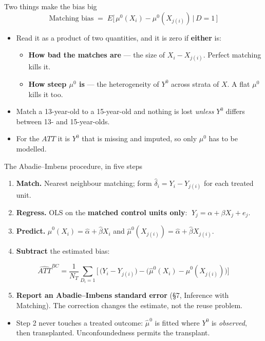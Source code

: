 \documentclass[
  11pt,
  ignorenonframetext,
  aspectratio=169,
]{beamer}
\providecommand{\tightlist}{%
  \setlength{\itemsep}{0pt}\setlength{\parskip}{0pt}}
\begin{document}
\begin{frame}{Two things make the bias big}
\protect{}\label{two-things-make-the-bias-big}
\[
\text{Matching bias} \;=\; E\big[\,\mu^0(X_i) - \mu^0(X_{j(i)}) \,\big|\, D=1\,\big]
\]

\begin{itemize}
\tightlist
\item
  Read it as a product of two quantities, and it is zero if
  \textbf{either} is:

  \begin{itemize}
  \tightlist
  \item
    \textbf{How bad the matches are} --- the size of \(X_i - X_{j(i)}\).
    Perfect matching kills it.
  \item
    \textbf{How steep \(\mu^0\) is} --- the heterogeneity of \(Y^0\)
    across strata of \(X\). A flat \(\mu^0\) kills it too.
  \end{itemize}
\item
  Match a 13-year-old to a 15-year-old and nothing is lost \emph{unless}
  \(Y^0\) differs between 13- and 15-year-olds.
\item
  For the \(ATT\) it is \(Y^0\) that is missing and imputed, so only
  \(\mu^0\) has to be modelled.
\end{itemize}
\end{frame}

\begin{frame}{The Abadie--Imbens procedure, in five steps}
\protect{}\label{the-abadieimbens-procedure-in-five-steps}
\begin{enumerate}
\tightlist
\item
  \textbf{Match.} Nearest neighbour matching; form
  \(\hat\delta_i = Y_i - Y_{j(i)}\) for each treated unit.
\item
  \textbf{Regress.} OLS on the \textbf{matched control units only}:
  \(\;Y_{j} = \alpha + \beta X_{j} + e_j\).
\item
  \textbf{Predict.} \(\hat\mu^0(X_i) = \hat\alpha + \hat\beta X_i\) and
  \(\hat\mu^0(X_{j(i)}) = \hat\alpha + \hat\beta X_{j(i)}\).
\item
  \textbf{Subtract} the estimated bias:
\end{enumerate}

\[
\widehat{ATT}^{BC} = \frac{1}{N_T}\sum_{D_i=1}\Big[\,\big(Y_i - Y_{j(i)}\big) - \big(\hat\mu^0(X_i) - \hat\mu^0(X_{j(i)})\big)\Big]
\]

\begin{enumerate}
\setcounter{enumi}{4}
\tightlist
\item
  \textbf{Report an Abadie--Imbens standard error} (§7, Inference with
  Matching). The correction changes the estimate, not the reuse problem.
\end{enumerate}

\begin{itemize}
\tightlist
\item
  Step 2 never touches a treated outcome: \(\hat\mu^0\) is fitted where
  \(Y^0\) is \emph{observed}, then transplanted. Unconfoundedness
  permits the transplant.
\end{itemize}
\end{frame}
\end{document}
